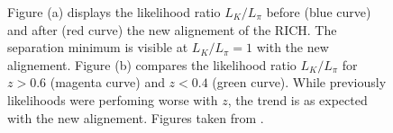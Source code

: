 \begin{figure}[!h]
  \centering
	\caption{Figure (a) displays the likelihood ratio $L_{K}/L_{\pi}$ before (blue curve) and after (red curve) the new alignement of the RICH. The separation minimum is visible at $L_{K}/L_{\pi} = 1$ with the new alignement. Figure (b) compares the likelihood ratio $L_{K}/L_{\pi}$ for $z>0.6$ (magenta curve) and $z<0.4$ (green curve). While previously likelihoods were perfoming worse with $z$, the trend is as expected with the new alignement. Figures taken from \cite{MarcinNew}.}
	\label{pic:newRICH}
\end{figure}

